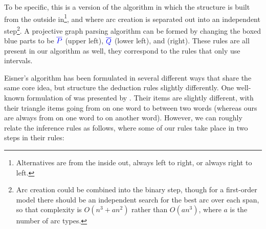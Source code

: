 To be specific, this is a version of the algorithm in which the structure is built from the outside in\footnote{
Alternatives are from the inside out, always left to right, or always right to left.
}, and where arc creation is separated out into an independent step\footnote{
Arc creation could be combined into the binary step, though for a first-order model there should be an independent search for the best arc over each span, so that complexity is $O(n^3 + an^2)$ rather than $O(an^3)$, where $a$ is the number of arc types.
}.
A projective graph parsing algorithm can be formed by changing the boxed blue parts to be $\textcolor{blue}{\overline{P}}$ (upper left), $\textcolor{blue}{\overline{Q}}$ (lower left), and \scalebox{2.0}{$\textcolor{blue}{.}$} (right).
These rules are all present in our algorithm as well, they correspond to the rules that only use intervals.

Eisner's algorithm has been formulated in several different ways that share the same core idea, but structure the deduction rules slightly differently.
One well-known formulation of was presented by \textcite{eisner-smith-2005}.
Their items are slightly different, with their triangle items going from on one word to between two words (whereas ours are always from on one word to on another word).
However, we can roughly relate the inference rules as follows, where some of our rules take place in two steps in their rules:

